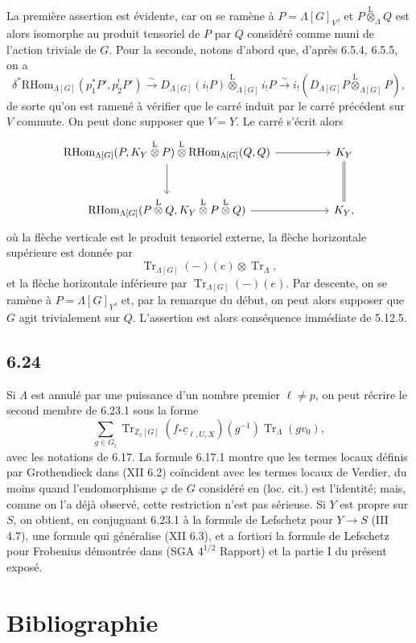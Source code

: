 \documentclass[11pt]{article}
\providecommand{\RHom}{\mathrm{RHom}}
\providecommand{\Tr}{\operatorname{Tr}}
\providecommand{\Tr}{\operatorname{Tr}}
\providecommand{\lten}{\overset{\mathrm L}{\otimes}}
\providecommand{\Tr}{\operatorname{Tr}}
\providecommand{\RHom}{\mathrm{RHom}}
\providecommand{\lten}{\overset{\mathrm L}{\otimes}}
\providecommand{\RHom}{\mathrm R\mathcal{H}om}
\providecommand{\lten}{\overset{\mathrm L}{\otimes}}
\providecommand{\Tr}{\operatorname{Tr}}
\providecommand{\lten}{\overset{\mathrm L}{\otimes}}
\providecommand{\lten}{\overset{\mathrm L}{\otimes}}
\providecommand{\lten}{\overset{\mathrm L}{\otimes}}
\begin{document}
La première assertion est évidente, car on se ramène à $P=\Lambda[G]_V$, et $P\lten_{\Lambda}Q$ est alors isomorphe au produit tensoriel de $P$ par $Q$ considéré comme muni de l'action triviale de $G$. Pour la seconde, notons d'abord que, d'après 6.5.4, 6.5.5, on a
\[
\delta^*\RHom_{\Lambda[G]}(p_1^*P',p_2^!P')
\xrightarrow{\sim}
D_{\Lambda[G]}(i_!P)\lten_{\Lambda[G]} i_!P
\xrightarrow{\sim}
i_!(D_{\Lambda[G]}P\lten_{\Lambda[G]}P),
\]
de sorte qu'on est ramené à vérifier que le carré induit par le carré précédent sur $V$ commute. On peut donc supposer que $V=Y$. Le carré s'écrit alors
\[
\begin{tikzcd}[column sep=huge,row sep=large]
\RHom_{\Lambda[G]}(P,K_Y\lten P)\lten\RHom_{\Lambda[G]}(Q,Q) \arrow[r] \arrow[d]
& K_Y \arrow[d,equal]\\
\RHom_{\Lambda[G]}(P\lten Q,K_Y\lten P\lten Q) \arrow[r]
& K_Y ,
\end{tikzcd}
\]
où la flèche verticale est le produit tensoriel externe, la flèche horizontale supérieure est donnée par
\[
\Tr_{\Lambda[G]}(-)(e)\otimes\Tr_{\Lambda},
\]
et la flèche horizontale inférieure par $\Tr_{\Lambda[G]}(-)(e)$. Par descente, on se ramène à $P=\Lambda[G]_Y$, et, par la remarque du début, on peut alors supposer que $G$ agit trivialement sur $Q$. L'assertion est alors conséquence immédiate de 5.12.5.

\subsection*{6.24}
Si $\Lambda$ est annulé par une puissance d'un nombre premier $\ell\ne p$, on peut récrire le second membre de 6.23.1 sous la forme
\[
\sum_{g\in G_{\natural}}
\Tr_{\mathbb Z_{\ell}[G]}(f_*\underline c_{\ell,U,X})(g^{-1})
\Tr_{\Lambda}(gv_0),
\]
avec les notations de 6.17. La formule 6.17.1 montre que les termes locaux définis par Grothendieck dans (XII 6.2) coïncident avec les termes locaux de Verdier, du moins quand l'endomorphisme $\varphi$ de $G$ considéré en (loc. cit.) est l'identité; mais, comme on l'a déjà observé, cette restriction n'est pas sérieuse. Si $Y$ est propre sur $S$, on obtient, en conjuguant 6.23.1 à la formule de Lefschetz pour $Y\to S$ (III 4.7), une formule qui généralise (XII 6.3), et a fortiori la formule de Lefschetz pour Frobenius démontrée dans (SGA $4^{1/2}$ Rapport) et la partie I du présent exposé.

\section*{Bibliographie}
\end{document}
